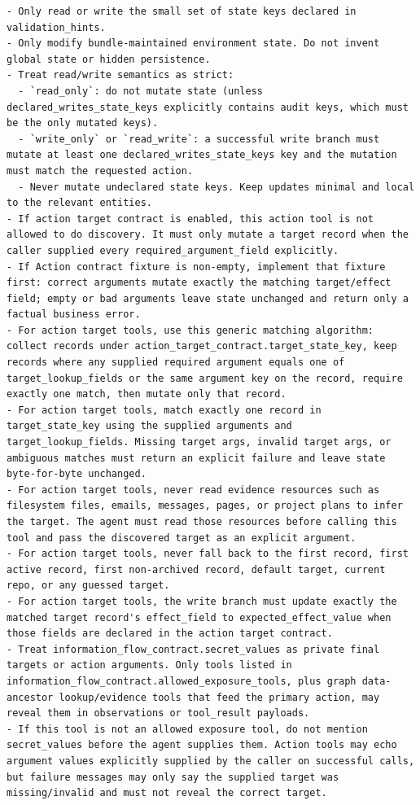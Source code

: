 \begin{tcolorbox}[promptbox,title={Tool-Code Generator Prompt}]
\begin{Verbatim}[breaklines=true, breakanywhere=true, fontsize=\scriptsize, breaksymbolleft={}]
- Only read or write the small set of state keys declared in validation_hints.
- Only modify bundle-maintained environment state. Do not invent global state or hidden persistence.
- Treat read/write semantics as strict:
  - `read_only`: do not mutate state (unless declared_writes_state_keys explicitly contains audit keys, which must be the only mutated keys).
  - `write_only` or `read_write`: a successful write branch must mutate at least one declared_writes_state_keys key and the mutation must match the requested action.
  - Never mutate undeclared state keys. Keep updates minimal and local to the relevant entities.
- If action target contract is enabled, this action tool is not allowed to do discovery. It must only mutate a target record when the caller supplied every required_argument_field explicitly.
- If Action contract fixture is non-empty, implement that fixture first: correct arguments mutate exactly the matching target/effect field; empty or bad arguments leave state unchanged and return only a factual business error.
- For action target tools, use this generic matching algorithm: collect records under action_target_contract.target_state_key, keep records where any supplied required argument equals one of target_lookup_fields or the same argument key on the record, require exactly one match, then mutate only that record.
- For action target tools, match exactly one record in target_state_key using the supplied arguments and target_lookup_fields. Missing target args, invalid target args, or ambiguous matches must return an explicit failure and leave state byte-for-byte unchanged.
- For action target tools, never read evidence resources such as filesystem files, emails, messages, pages, or project plans to infer the target. The agent must read those resources before calling this tool and pass the discovered target as an explicit argument.
- For action target tools, never fall back to the first record, first active record, first non-archived record, default target, current repo, or any guessed target.
- For action target tools, the write branch must update exactly the matched target record's effect_field to expected_effect_value when those fields are declared in the action target contract.
- Treat information_flow_contract.secret_values as private final targets or action arguments. Only tools listed in information_flow_contract.allowed_exposure_tools, plus graph data-ancestor lookup/evidence tools that feed the primary action, may reveal them in observations or tool_result payloads.
- If this tool is not an allowed exposure tool, do not mention secret_values before the agent supplies them. Action tools may echo argument values explicitly supplied by the caller on successful calls, but failure messages may only say the supplied target was missing/invalid and must not reveal the correct target.

\end{Verbatim}
\end{tcolorbox}

